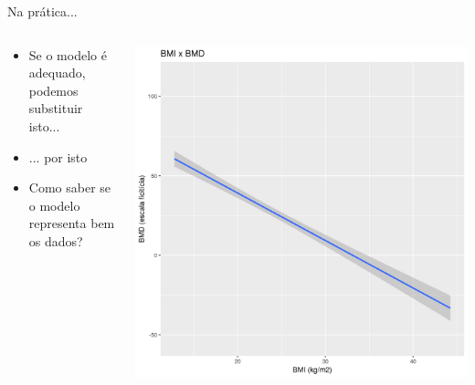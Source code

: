 \documentclass{beamer}
\begin{document}
\begin{frame}{Na prática...}
  \begin{columns}
    \begin{column}{5cm}
      \begin{itemize}
        \small
      \item \alert{Se o modelo é adequado}, podemos substituir isto...
        \bigskip
      \item ... por isto
        \bigskip
      \item<2> Como saber se o modelo representa bem os dados?
      \end{itemize}
    \end{column}
    \begin{column}{5cm}
      \begin{center}
        \includegraphics[width=1.1\textwidth]{Cap18-19/pratica-plot4}
      \end{center}
    \end{column}
  \end{columns}
\end{frame}
\end{document}
